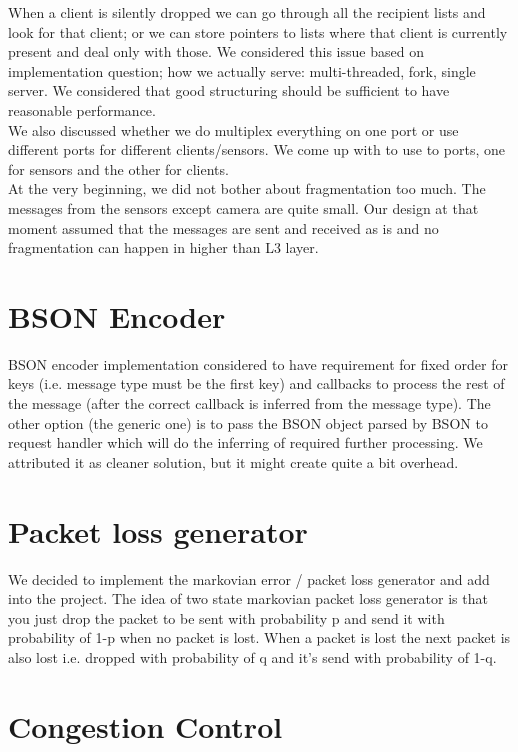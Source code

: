 \documentclass[11pt,a4paper]{report}
\begin{document}
When a client is silently dropped we can go through all the recipient lists and look for that client; or we can store pointers to lists where that client is currently present and deal only with those. We considered this issue based on implementation question; how we actually serve: multi-threaded, fork, single server. We considered that good structuring should be sufficient to have reasonable performance. \\

We also discussed whether we do multiplex everything on one port or use different ports for different clients/sensors. We come up with to use to ports, one for sensors and the other for clients. \\

At the very beginning, we did not bother about fragmentation too much. The messages from the sensors except camera are quite small. Our design at that moment assumed that the messages are sent and received as is and no fragmentation can happen in higher than L3 layer. 

\section*{BSON Encoder}

BSON encoder implementation considered to have requirement for fixed order for keys (i.e. message type must be the first key) and callbacks to process the rest of the message (after the correct callback is inferred from the message type). The other option (the generic one) is to pass the BSON object parsed by BSON to request handler which will do the inferring of required further processing. We attributed it as cleaner solution, but it might create quite a bit overhead.


\section*{Packet loss generator}

We decided to implement the markovian error / packet loss generator and add into the project. The idea of two state markovian packet loss generator is that you just drop the packet to be sent with probability p and send it with probability of 1-p when no packet is lost. When a packet is lost the next packet is also lost i.e. dropped with probability of q and it's send with probability of 1-q.

\section*{Congestion Control}
\end{document}

